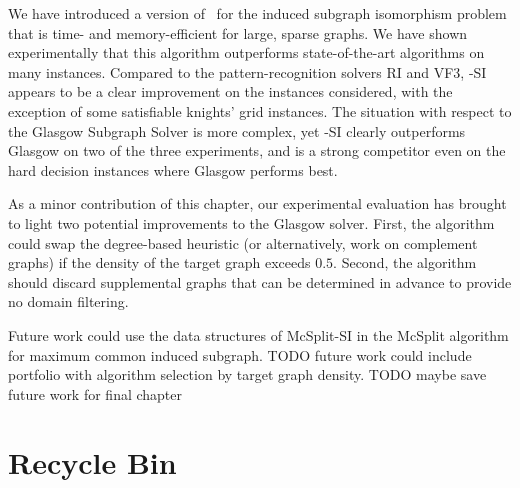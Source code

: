 We have introduced a version of \McSplit\ for the induced subgraph isomorphism problem that is time- and memory-efficient for large, sparse graphs.
We have shown experimentally that this algorithm outperforms state-of-the-art algorithms on many instances.
Compared to the pattern-recognition solvers RI and VF3, \McSplit-SI appears to be a clear improvement
on the instances considered, with the exception of some satisfiable knights' grid instances.  The situation
with respect to the Glasgow Subgraph Solver is more complex, yet \McSplit-SI clearly outperforms Glasgow on
two of the three experiments, and is a strong competitor even on the hard decision instances
where Glasgow performs best.

As a minor contribution of this chapter, our experimental evaluation has
brought to light two potential improvements to the Glasgow solver.  First, the
algorithm could swap the degree-based heuristic (or alternatively, work on
complement graphs) if the density of the target graph exceeds $0.5$.  Second,
the algorithm should discard supplemental graphs that can be determined in
advance to provide no domain filtering.

Future work could use the data structures of McSplit-SI in the McSplit algorithm for maximum common induced subgraph.
TODO future work could include portfolio with algorithm selection by target graph density.
TODO maybe save future work for final chapter

\section{Recycle Bin}

